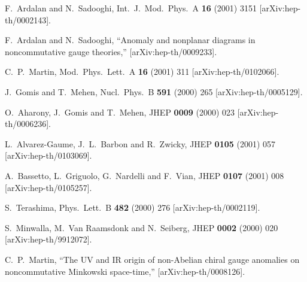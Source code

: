 \documentclass[a4paper,12pt]{article}
\begin{document}
\begin{thebibliography}{99}
F.~Ardalan and N.~Sadooghi,
Int.\ J.\ Mod.\ Phys.\ A {\bf 16} (2001) 3151
[arXiv:hep-th/0002143].

F.~Ardalan and N.~Sadooghi,
``Anomaly and nonplanar diagrams in noncommutative gauge theories,''
[arXiv:hep-th/0009233].

C.~P.~Martin,
Mod.\ Phys.\ Lett.\ A {\bf 16} (2001) 311
[arXiv:hep-th/0102066].

J.~Gomis and T.~Mehen,
Nucl.\ Phys.\ B {\bf 591} (2000) 265
[arXiv:hep-th/0005129].

O.~Aharony, J.~Gomis and T.~Mehen,
JHEP {\bf 0009} (2000) 023
[arXiv:hep-th/0006236].


L.~Alvarez-Gaume, J.~L.~Barbon and R.~Zwicky,
JHEP {\bf 0105} (2001) 057
[arXiv:hep-th/0103069].

A.~Bassetto, L.~Griguolo, G.~Nardelli and F.~Vian,
JHEP {\bf 0107} (2001) 008
[arXiv:hep-th/0105257].

S.~Terashima,
Phys.\ Lett.\ B {\bf 482} (2000) 276
[arXiv:hep-th/0002119].



S.~Minwalla, M.~Van Raamsdonk and N.~Seiberg,
JHEP {\bf 0002} (2000) 020
[arXiv:hep-th/9912072].


C.~P.~Martin,
``The UV and IR origin of non-Abelian chiral gauge anomalies on  noncommutative Minkowski space-time,''
[arXiv:hep-th/0008126].



\end{thebibliography}
\end{document}
